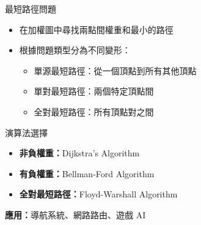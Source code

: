 \documentclass{beamer}
\begin{document}
\begin{frame}{最短路徑問題}
\begin{itemize}
    \item 在加權圖中尋找兩點間權重和最小的路徑
    \item 根據問題類型分為不同變形：
    \begin{itemize}
        \item 單源最短路徑：從一個頂點到所有其他頂點
        \item 單對最短路徑：兩個特定頂點間
        \item 全對最短路徑：所有頂點對之間
    \end{itemize}
\end{itemize}

\vspace{1em}
\begin{block}{演算法選擇}
\begin{itemize}
    \item \textbf{非負權重：}Dijkstra's Algorithm
    \item \textbf{有負權重：}Bellman-Ford Algorithm
    \item \textbf{全對最短路徑：}Floyd-Warshall Algorithm
\end{itemize}
\end{block}

\vspace{1em}
\textbf{應用：}導航系統、網路路由、遊戲 AI
\end{frame}
\end{document}
